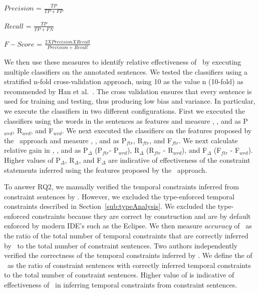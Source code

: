 \begin{center}

$Precision$ = $\frac{TP}{TP + FP}$

$Recall$ = $\frac{TP}{TP + FN}$

$F-Score$ = $\frac{2 X Precision X Recall}{Precision + Recall}$
\end{center}

We then use these measures to identify relative effectiveness of \tool\ by executing multiple classifiers on the annotated sentences.
We tested the classifiers using a stratified n-fold cross-validation approach,
using 10 as the value n (10-fold) as recommended by Han et al.~\cite{han2006data}.
The cross validation ensures that every sentence is used for training and testing,
thus producing low bias and variance.
In particular, we execute the classifiers in two different configurations.
First we executed the classifiers using the words in the sentences as features and measure , , and  as P$_{wrd}$, R$_{wrd}$, and F$_{wrd}$.
We next executed the classifiers on the features proposed by the \tool\ approach and measure , , and  as P$_{ftr}$, R$_{ftr}$, and F$_{ftr}$.
We next calculate relative gain in , , and  as P$_{\Delta}$ (P$_{ftr}$- P$_{wrd}$), R$_{\Delta}$ (R$_{ftr}$ - R$_{wrd}$), and F$_{\Delta}$ (F$_{ftr}$ - F$_{wrd}$). 
Higher values of P$_{\Delta}$, R$_{\Delta}$, and F$_{\Delta}$ are indicative of effectiveness of the constraint statements inferred using the features proposed by the \tool\ approach.


To answer RQ2, we manually verified the temporal constraints inferred from constraint sentences by \tool.
However, we excluded the type-enforced temporal constraints described in Section~\ref{sub:typeAnalysis}.
We excluded the type-enforced constraints because they are correct by construction and are by default enforced by modern IDE's such as the Eclipse. 
We then measure $accuracy$ of \tool\ as the ratio of the total number of temporal constraints that
are correctly inferred by \tool\ to the total number of constraint sentences. Two authors
independently verified the correctness of the temporal constraints inferred by \tool.
We define the  of \tool\ as the ratio of constraint sentences with correctly inferred temporal constraints
to the total number of constraint sentences. 
Higher value of  is indicative of effectiveness of \tool\ in inferring temporal constraints from constraint sentences.


